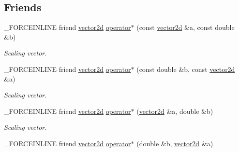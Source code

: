 \subsection*{Friends}
\begin{DoxyCompactItemize}
\item 
\hypertarget{classbt_1_1vector2d_a3784c690702627dbcf3f4bb6bc9974c0}{\-\_\-\-F\-O\-R\-C\-E\-I\-N\-L\-I\-N\-E friend \hyperlink{classbt_1_1vector2d}{vector2d} \hyperlink{classbt_1_1vector2d_a3784c690702627dbcf3f4bb6bc9974c0}{operator$\ast$} (const \hyperlink{classbt_1_1vector2d}{vector2d} \&a, const double \&b)}\label{classbt_1_1vector2d_a3784c690702627dbcf3f4bb6bc9974c0}

\begin{DoxyCompactList}\small\item\em Scaling vector. \end{DoxyCompactList}\item 
\hypertarget{classbt_1_1vector2d_aa18056d531dd60f5e4eeff46d25bd442}{\-\_\-\-F\-O\-R\-C\-E\-I\-N\-L\-I\-N\-E friend \hyperlink{classbt_1_1vector2d}{vector2d} \hyperlink{classbt_1_1vector2d_aa18056d531dd60f5e4eeff46d25bd442}{operator$\ast$} (const double \&b, const \hyperlink{classbt_1_1vector2d}{vector2d} \&a)}\label{classbt_1_1vector2d_aa18056d531dd60f5e4eeff46d25bd442}

\begin{DoxyCompactList}\small\item\em Scaling vector. \end{DoxyCompactList}\item 
\hypertarget{classbt_1_1vector2d_a5d5ce6f1932058491c6b836d0a75e41a}{\-\_\-\-F\-O\-R\-C\-E\-I\-N\-L\-I\-N\-E friend \hyperlink{classbt_1_1vector2d}{vector2d} \hyperlink{classbt_1_1vector2d_a5d5ce6f1932058491c6b836d0a75e41a}{operator$\ast$} (\hyperlink{classbt_1_1vector2d}{vector2d} \&a, double \&b)}\label{classbt_1_1vector2d_a5d5ce6f1932058491c6b836d0a75e41a}

\begin{DoxyCompactList}\small\item\em Scaling vector. \end{DoxyCompactList}\item 
\hypertarget{classbt_1_1vector2d_a61e50013c4c1484e54ac438d0fcafc2b}{\-\_\-\-F\-O\-R\-C\-E\-I\-N\-L\-I\-N\-E friend \hyperlink{classbt_1_1vector2d}{vector2d} \hyperlink{classbt_1_1vector2d_a61e50013c4c1484e54ac438d0fcafc2b}{operator$\ast$} (double \&b, \hyperlink{classbt_1_1vector2d}{vector2d} \&a)}\label{classbt_1_1vector2d_a61e50013c4c1484e54ac438d0fcafc2b}


\end{DoxyCompactItemize}
